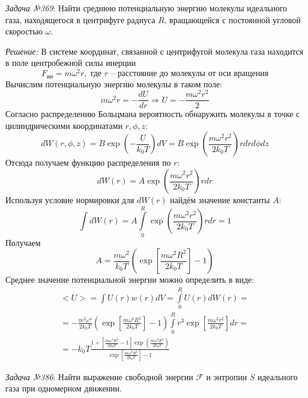 \documentclass[14pt,final,titlepage,pscyr]{hedwork}
\begin{document}
\emph{Задача №369}: Найти среднюю потенциальную энергию молекулы идеального 
газа, находящегося в центрифуге радиуса \( R \), вращающейся с постоянной 
угловой скоростью \( \omega \).

\emph{Решение:} В системе координат, связанной с центрифугой молекула газа 
находится в поле центробежной силы инерции
\[
	F_\text{ин} = m\omega^2 r, \text{ где } r \text{ -- расстояние до 
		молекулы от оси вращения}
\]
Вычислим потенциальную энергию молекулы в таком поле:
\[
	m\omega^2 r = -\frac{dU}{dr} \Rightarrow 
	U = -\frac{m\omega^2 r^2}{2}
\]
Согласно распределению Больцмана вероятность обнаружить молекулы в точке с 
цилиндрическими координатами \( r, \phi, z \):
\[
	dW(r,\phi,z) = B\exp\left(-\frac{U}{k_0 T}\right) dV = B
		\exp\left(\frac{m\omega^2 r^2}{2k_0 T}\right) r dr d\phi dz
\]
Отсюда получаем функцию распределения по \( r \):
\[
	dW(r) = A\exp\left(\frac{m\omega^2 r^2}{2k_0 T}\right) r dr
\]
Используя условие нормировки для \( dW(r) \) найдём значение константы \( A \):
\[
	\int dW(r) = A\int\limits_{0}^{R} 
		\exp\left( \frac{m\omega^2 r^2}{2k_0 T} \right) r dr = 1
\]
Получаем
\[
	A = \frac{m\omega^2}{k_0 T}\left( 
		\exp\left[\frac{m\omega^2 R^2}{2k_0 T}\right] - 1 \right)
\]
Среднее значение потенциальной энергии можно определить в виде:
\begin{gather}
	<U> = \int U(r) w(r) dV = \int\limits_{0}^{R} U(r) dW(r) = 
	\nonumber \\ =
		-\frac{m^2 \omega^4}{2k_0 T}\left( 
		\exp\left[\frac{m\omega^2 R^2}{2k_0 T}\right] - 1 \right)
		\int\limits_{0}^{R} r^3 \exp\left[ 
		\frac{m\omega^2 r^2}{2k_0 T} \right] dr = \nonumber \\ =
		-k_0 T \frac{1 + 
			\left[\frac{m\omega^2 R^2}{2k_0 T} - 1 \right]
			\exp\left( \frac{m\omega^2 R^2}{2k_0 T} \right)}
			{\exp\left[\frac{m\omega^2 R^2}{2k_0 T}\right] - 1}
	\nonumber
\end{gather}
\newpage

\emph{Задача №386}: Найти выражение свободной энергии \( \mathcal{F} \) и 
энтропии \( S \) идеального газа при одномерном движении.
\end{document}
